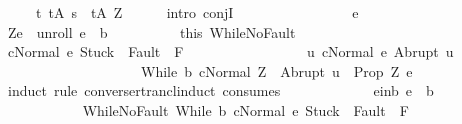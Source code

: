 \begin{isabellebody}
\ \ \ \ \ {\isacharparenleft}{\isasymforall}t{\isachardot}\ t{\isasymin}{\isacharquery}A\ s\ {\isasymlongrightarrow}\ t{\isasymin}{\isacharquery}A\ Z{\isacharparenright}{\isachardoublequoteclose}\isanewline
\ \ \ \ \isamarkupfalse%
\ {\isacharparenleft}intro\ conjI{\isacharparenright}\isanewline
\ \ \ \ \ \ \isacommand{{\isacharbraceleft}}\isamarkupfalse%
\isanewline
\ \ \ \ \ \ \ \ \isamarkupfalse%
\ e\isanewline
\ \ \ \ \ \ \ \ \isamarkupfalse%
\ {\isachardoublequoteopen}{\isacharparenleft}Z{\isacharcomma}e{\isacharparenright}\ {\isasymin}\ {\isacharquery}unroll{\isachardoublequoteclose}\ {\isachardoublequoteopen}e\ {\isasymin}\ b{\isachardoublequoteclose}\isanewline
\ \ \ \ \ \ \ \ \isamarkupfalse%
\ this\ WhileNoFault\isanewline
\ \ \ \ \ \ \ \ \isamarkupfalse%
\ {\isachardoublequoteopen}{\isasymGamma}{\isasymturnstile}{\isasymlangle}c{\isacharcomma}Normal\ e{\isasymrangle}\ {\isasymRightarrow}{\isasymnotin}{\isacharparenleft}{\isacharbraceleft}Stuck{\isacharbraceright}\ {\isasymunion}\ Fault\ {\isacharbackquote}\ {\isacharparenleft}{\isacharminus}F{\isacharparenright}{\isacharparenright}\ {\isasymand}\ \isanewline
\ \ \ \ \ \ \ \ \ \ \ \ \ \ \ {\isacharparenleft}{\isasymforall}u{\isachardot}\ {\isasymGamma}{\isasymturnstile}{\isasymlangle}c{\isacharcomma}Normal\ e{\isasymrangle}\ {\isasymRightarrow}Abrupt\ u\ {\isasymlongrightarrow}\ \isanewline
\ \ \ \ \ \ \ \ \ \ \ \ \ \ \ \ \ \ \ \ {\isasymGamma}{\isasymturnstile}{\isasymlangle}While\ b\ c{\isacharcomma}Normal\ Z{\isasymrangle}\ {\isasymRightarrow}\ Abrupt\ u{\isacharparenright}{\isachardoublequoteclose}\ {\isacharparenleft}\ {\isachardoublequoteopen}{\isacharquery}Prop\ Z\ e{\isachardoublequoteclose}{\isacharparenright}\isanewline
\ \ \ \ \ \ \ \ \isamarkupfalse%
\ {\isacharparenleft}induct\ rule{\isacharcolon}\ converse{\isacharunderscore}rtrancl{\isacharunderscore}induct\ {\isacharbrackleft}consumes\ {}{\isacharbrackright}{\isacharparenright}\isanewline
\ \ \ \ \ \ \ \ \ \ \isamarkupfalse%
\ e{\isacharunderscore}in{\isacharunderscore}b{\isacharcolon}\ {\isachardoublequoteopen}e\ {\isasymin}\ b{\isachardoublequoteclose}\isanewline
\ \ \ \ \ \ \ \ \ \ \isamarkupfalse%
\ WhileNoFault{\isacharcolon}\ {\isachardoublequoteopen}{\isasymGamma}{\isasymturnstile}{\isasymlangle}While\ b\ c{\isacharcomma}Normal\ e{\isasymrangle}\ {\isasymRightarrow}{\isasymnotin}{\isacharparenleft}{\isacharbraceleft}Stuck{\isacharbraceright}\ {\isasymunion}\ Fault\ {\isacharbackquote}\ {\isacharparenleft}{\isacharminus}F{\isacharparenright}{\isacharparenright}{\isachardoublequoteclose}\isanewline

\end{isabellebody}
